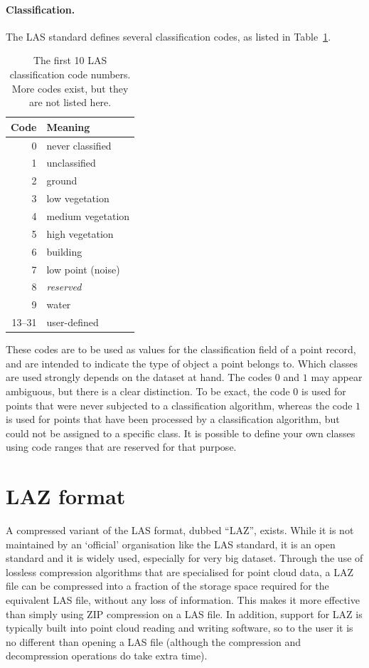 \paragraph{Classification.}
The LAS standard defines several classification codes, as listed in Table~\ref{tab:las-classes}.
\begin{table}
  \centering
  \begin{tabular}{r|l}
  Code & Meaning \\ \midrule
  0 & never classified \\
  1 & unclassified \\
  2 & ground \\
  3 & low vegetation \\
  4 & medium vegetation \\
  5 & high vegetation \\
  6 & building \\
  7 & low point (noise) \\
  8 & \emph{reserved} \\
  9 & water \\
  13--31 & user-defined \\
\end{tabular}
\caption{The first 10 LAS classification code numbers. More codes exist, but they are not listed here.}%
\label{tab:las-classes}
\end{table}
These codes are to be used as values for the classification field of a point record, and are intended to indicate the type of object a point belongs to.
Which classes are used strongly depends on the dataset at hand.
The codes $0$ and $1$ may appear ambiguous, but there is a clear distinction.
To be exact, the code $0$ is used for points that were never subjected to a classification algorithm, whereas the code $1$ is used for points that have been processed by a classification algorithm, but could not be assigned to a specific class.
It is possible to define your own classes using code ranges that are reserved for that purpose.


\section{LAZ format}%

A compressed variant of the LAS format, dubbed ``LAZ'', exists.
While it is not maintained by an `official' organisation like the LAS standard, it is an open standard and it is widely used, especially for very big dataset.
Through the use of lossless compression algorithms that are specialised for point cloud data, a LAZ file can be compressed into a fraction of the storage space required for the equivalent LAS file, without any loss of information.
This makes it more effective than simply using ZIP compression on a LAS file.
In addition, support for LAZ is typically built into point cloud reading and writing software, so to the user it is no different than opening a LAS file (although the compression and decompression operations do take extra time).


